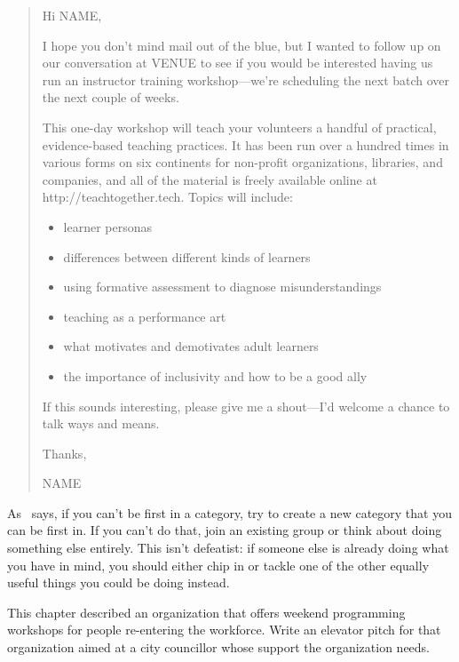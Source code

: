 \begin{quote}

  \noindent
  Hi NAME,

  I hope you don't mind mail out of the blue,
  but I wanted to follow up on our conversation at VENUE
  to see if you would be interested having us run an instructor training workshop---we're
  scheduling the next batch over the next couple of weeks.

  This one-day workshop will teach your volunteers
  a handful of practical, evidence-based teaching practices.
  It has been run over a hundred times in various forms on six continents
  for non-profit organizations, libraries, and companies,
  and all of the material is freely available online at http://teachtogether.tech.
  Topics will include:

  \begin{itemize}
  \item learner personas
  \item differences between different kinds of learners
  \item using formative assessment to diagnose misunderstandings
  \item teaching as a performance art
  \item what motivates and demotivates adult learners
  \item the importance of inclusivity and how to be a good ally
  \end{itemize}
  
  If this sounds interesting,
  please give me a shout---I'd welcome a chance to talk ways and means.

  Thanks,

  NAME

\end{quote}


As~\cite{Kuch2011} says,
if you can't be first in a category,
try to create a new category that you can be first in.
If you can't do that,
join an existing group or think about doing something else entirely.
This isn't defeatist:
if someone else is already doing what you have in mind,
you should either chip in or tackle one of the other equally useful things
you could be doing instead.



This chapter described an organization
that offers weekend programming workshops for people re-entering the workforce.
Write an elevator pitch for that organization
aimed at a city councillor whose support the organization needs.


